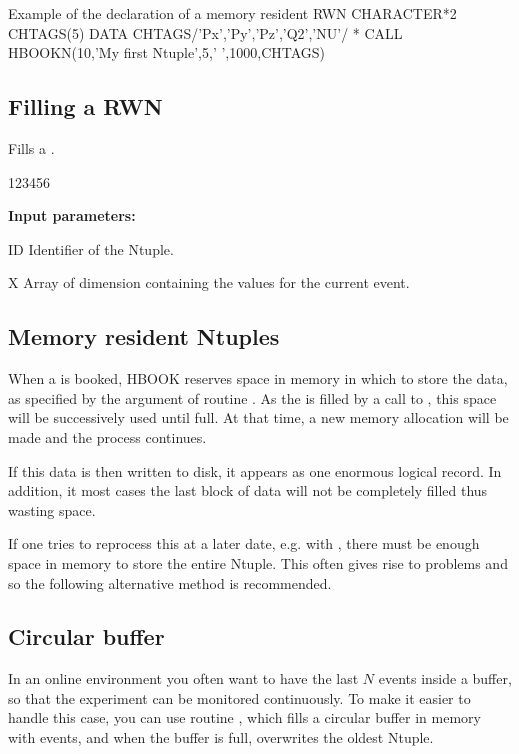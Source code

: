 \begin{XMPt}{Example of the declaration of a memory resident RWN}
      CHARACTER*2 CHTAGS(5)
      DATA CHTAGS/'Px','Py','Pz','Q2','NU'/
 *
      CALL HBOOKN(10,'My first Ntuple',5,' ',1000,CHTAGS)
\end{XMPt}

\subsection{Filling a RWN}
\label{HNTUFILL}


\Action
Fills a \RWN{}.

\begin{DLttc}{123456}
\item[{\rm\bf Input parameters:}]
\item[ID] Identifier of the Ntuple.
\item[X] Array of dimension  containing
the values for the current event.
\end{DLttc}

\subsection*{Memory resident Ntuples}

When a \RWN{} is booked, HBOOK reserves space in memory
in which to store the data, as specified by the 
argument of routine .
As the \RWN{} is filled by a call to ,
this space will be successively used until full.
At that time, a new memory allocation will be made
and the process continues.

If this data is then written to disk, it appears as one
enormous logical record.
In addition, it most cases the last block of data will
not be completely filled thus wasting space.

If one tries to reprocess this \RWN{} at a later date,
e.g. with \PAW{}, there must be enough space in memory to
store the entire Ntuple.
This often gives rise to problems
and so the following alternative method is recommended.

\subsection*{Circular buffer}

In an online environment you often want to have the last $N$ events
inside a buffer, so that the experiment can be monitored continuously.
To make it easier to handle this case, you can use routine ,
which fills a circular buffer in memory with \RWN{} events, and when
the buffer is full, overwrites the oldest Ntuple.

